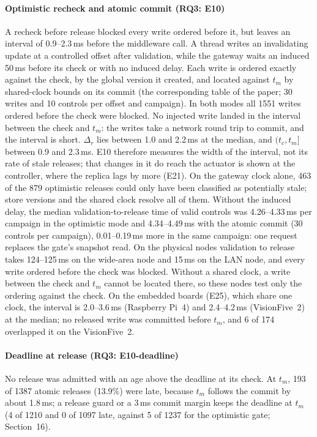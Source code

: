 \documentclass[11pt]{article}
\begin{document}
\paragraph{Optimistic recheck and atomic commit (RQ3: E10)}
A recheck before release blocked every write ordered before it, but leaves an interval of 0.9--2.3\,ms before the middleware call. A thread writes an invalidating update at a controlled offset after validation, while the gateway waits an induced 50\,ms before its check or with no induced delay. Each write is ordered exactly against the check, by the global version it created, and located against $t_m$ by shared-clock bounds on its commit (the corresponding table of the paper; 30 writes and 10 controls per offset and campaign). In both modes all 1551 writes ordered before the check were blocked. No injected write landed in the interval between the check and $t_m$: the writes take a network round trip to commit, and the interval is short. $\Delta_r$ lies between 1.0 and 2.2\,ms at the median, and $(t_c,t_m]$ between 0.9 and 2.3\,ms. E10 therefore measures the width of the interval, not its rate of stale releases; that changes in it do reach the actuator is shown at the controller, where the replica lags by more (E21). On the gateway clock alone, 463 of the 879 optimistic releases could only have been classified as potentially stale; store versions and the shared clock resolve all of them. Without the induced delay, the median validation-to-release time of valid controls was 4.26--4.33\,ms per campaign in the optimistic mode and 4.34--4.49\,ms with the atomic commit (30 controls per campaign), 0.01--0.19\,ms more in the same campaign: one request replaces the gate's snapshot read. On the physical nodes validation to release takes 124--125\,ms on the wide-area node and 15\,ms on the LAN node, and every write ordered before the check was blocked. Without a shared clock, a write between the check and $t_m$ cannot be located there, so these nodes test only the ordering against the check. On the embedded boards (E25), which share one clock, the interval is 2.0--3.6\,ms (Raspberry Pi~4) and 2.4--4.2\,ms (VisionFive~2) at the median; no released write was committed before $t_m$, and 6 of 174 overlapped it on the VisionFive~2.

\paragraph{Deadline at release (RQ3: E10-deadline)}
No release was admitted with an age above the deadline at its check. At $t_m$, 193 of 1387 atomic releases (13.9\%) were late, because $t_m$ follows the commit by about 1.8\,ms; a release guard or a 3\,ms commit margin keeps the deadline at $t_m$ (4 of 1210 and 0 of 1097 late, against 5 of 1237 for the optimistic gate; Section~16).
\end{document}
